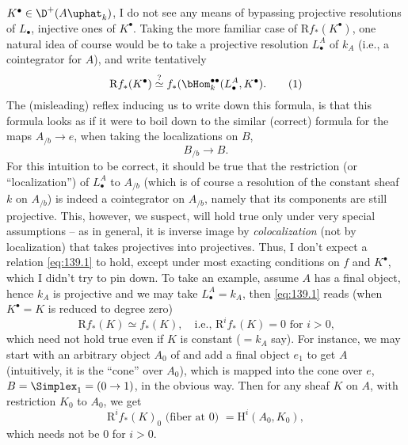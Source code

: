 $K^\bullet\in\D^+(A\uphat_k)$, I do not see any means of bypassing
projective resolutions of $L_\bullet$, injective ones of
$K^\bullet$. Taking the more familiar case of $\mathrm
Rf_*(K^\bullet)$, one natural idea of course would be to take a
projective resolution $L_\bullet^A$ of $k_A$ (i.e., a cointegrator for
$A$), and write tentatively
\begin{equation}
  \label{eq:139.1}
  \mathrm Rf_*(K^\bullet) \overset{\text{?}}{\simeq}
  f_*(\bHom_k^{\bullet\bullet}(L_\bullet^A,K^\bullet).\tag{1}
\end{equation}
The (misleading) reflex inducing us to write down this formula, is
that this formula looks as if it were to boil down to the similar
(correct) formula for the maps $A_{/b}\to e$, when taking the
localizations on $B$,
\[B_{/b}\to B.\]
For this intuition to be correct, it should be true that the
restriction (or ``localization'') of $L_\bullet^A$ to $A_{/b}$ (which
is of course a resolution of the constant sheaf $k$ on $A_{/b}$) is
indeed a cointegrator on $A_{/b}$, namely that its components are
still projective. This, however, we suspect, will hold true only under
very special assumptions -- as in general, it is inverse image by
\emph{colocalization} (not by localization) that takes projectives
into projectives. Thus, I don't expect a relation \eqref{eq:139.1} to
hold, except under most exacting conditions on $f$ and $K^\bullet$,
which I didn't try to pin down. To take an example, assume $A$ has a
final object, hence $k_A$ is projective and we may take
$L_\bullet^A=k_A$, then \eqref{eq:139.1} reads (when $K^\bullet=K$ is
reduced to degree zero)
\[\mathrm Rf_*(K) \simeq f_*(K), \quad
  \text{i.e., $\mathrm R^if_*(K)=0$ for $i>0$,}\]
which need not hold true even if $K$ is constant ($=k_A$ say). For
instance, we may start with an arbitrary object $A_0$ of \Cat{} and
add a final object $e_1$ to get $A$ (intuitively, it is the ``cone''
over $A_0$), which is mapped into the cone over $e$,
$B=\Simplex_1=(0\to 1)$, in the obvious way. Then for any sheaf $K$ on
$A$, with restriction $K_0$ to $A_0$, we get
\[\mathrm R^if_*(K)_0\text{ (fiber at $0$) } = \mathrm H^i(A_0,K_0),\]
which needs not be $0$ for $i>0$.

